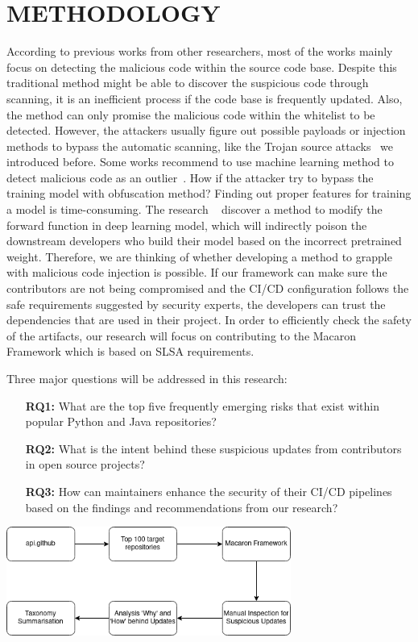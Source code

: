 \section{METHODOLOGY}
According to previous works from other researchers, most of the works mainly focus on detecting the malicious
code within the source code base. Despite this traditional method might be able to discover the suspicious 
code through scanning, it is an inefficient process if the code base is frequently updated. Also, the method 
can only promise the malicious code within the whitelist to be detected. However, the attackers usually 
figure out possible payloads or injection methods to bypass the automatic scanning, like the Trojan source 
attacks~\cite{boucher2023trojan} we introduced before. 
Some works recommend to use machine learning method to detect malicious code as an outlier~\cite{garrett2019detecting}.
How if the attacker try to bypass the training model with obfuscation method? Finding out proper features for
training a model is time-consuming. The research ~\cite{zheng2023careful} discover a method to modify
the forward function in deep learning model, which will indirectly poison the downstream developers who build 
their model based on the incorrect pretrained weight. 
Therefore, we are thinking of whether developing a method to grapple with malicious code injection is possible.
If our framework can make sure the contributors are not being compromised and the CI/CD configuration follows
the safe requirements suggested by security experts, the developers can trust the dependencies that are
used in their project. 
In order to efficiently check the safety of the artifacts, our research will focus on contributing to the Macaron
Framework which is based on SLSA requirements.

Three major questions will be addressed in this research:
\begin{enumerate}
    \item[{\textbf{RQ1:}}] What are the top five frequently emerging risks that exist within popular Python and Java repositories?
    \item[{\textbf{RQ2:}}] What is the intent behind these suspicious updates from contributors in open source projects?
    \item[{\textbf{RQ3:}}] How can maintainers enhance the security of their CI/CD pipelines based on the findings and recommendations from our research?
\end{enumerate}

\begin{center}
    \includegraphics[width=0.7\textwidth]{./screenshot/research_flow.png}
\end{center}

